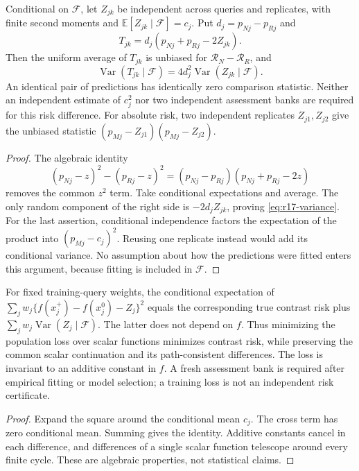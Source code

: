 \begin{proposition}\label{prop:r17-cancellation}
Conditional on $\mathcal F$, let $Z_{jk}$ be independent across queries and
replicates, with finite second moments and $\mathbb E[Z_{jk}\mid\mathcal F]=c_j$.
Put $d_j=p_{Nj}-p_{Rj}$ and
\[
 T_{jk}=d_j(p_{Nj}+p_{Rj}-2Z_{jk}).
\]
Then the uniform average of $T_{jk}$ is unbiased for
$\mathcal R_N-\mathcal R_R$, and
\begin{equation}\label{eq:r17-variance}
 \operatorname{Var}(T_{jk}\mid\mathcal F)
   =4d_j^2\operatorname{Var}(Z_{jk}\mid\mathcal F).
\end{equation}
An identical pair of predictions has identically zero comparison statistic.
Neither an independent estimate of $c_j^2$ nor two independent assessment
banks are required for this risk difference. For absolute risk, two independent
replicates $Z_{j1},Z_{j2}$ give the unbiased statistic
$(p_{Mj}-Z_{j1})(p_{Mj}-Z_{j2})$.
\end{proposition}
\begin{proof}
The algebraic identity
\[
 (p_{Nj}-z)^2-(p_{Rj}-z)^2
   =(p_{Nj}-p_{Rj})(p_{Nj}+p_{Rj}-2z)
\]
removes the common $z^2$ term. Take conditional expectations and average.
The only random component of the right side is $-2d_jZ_{jk}$, proving
\eqref{eq:r17-variance}. For the last assertion, conditional independence
factors the expectation of the product into
$(p_{Mj}-c_j)^2$. Reusing one replicate instead would add its conditional
variance. No assumption about how the predictions were fitted enters this
argument, because fitting is included in $\mathcal F$.
\end{proof}

\begin{corollary}\label{cor:r17-training}
For fixed training-query weights, the conditional expectation of
$\sum_j w_j\{f(x_j^+)-f(x_j^0)-Z_j\}^2$ equals the corresponding true contrast
risk plus $\sum_jw_j\operatorname{Var}(Z_j\mid\mathcal F)$. The latter does
not depend on $f$. Thus minimizing the population loss over scalar functions
minimizes contrast risk, while preserving the common scalar continuation and
its path-consistent differences. The loss is invariant to an additive constant
in $f$. A fresh assessment bank is required after empirical fitting or model
selection; a training loss is not an independent risk certificate.
\end{corollary}
\begin{proof}
Expand the square around the conditional mean $c_j$. The cross term has zero
conditional mean. Summing gives the identity. Additive constants cancel in
each difference, and differences of a single scalar function telescope around
every finite cycle. These are algebraic properties, not statistical claims.
\end{proof}

